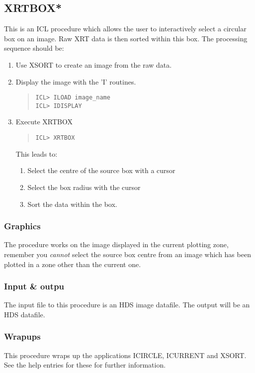 \documentclass{book}
\renewcommand{\_}{{\tt\char'137}}     %
\begin{document}
\subsection{XRTBOX*}
This is an ICL procedure which allows the user to interactively select
a circular box on an image. Raw XRT data is then sorted within this
box. The processing sequence should be:
 
\begin{enumerate}
\item Use XSORT to create an image from the raw data.
\item Display the image with the 'I' routines.
\begin{quote}\begin{verbatim}
ICL> ILOAD image_name
ICL> IDISPLAY
\end{verbatim}\end{quote}
\item Execute XRTBOX
\begin{quote}\begin{verbatim}
ICL> XRTBOX
\end{verbatim}\end{quote}
This leads to:
 
\begin{enumerate}
\item Select the centre of the source box with a cursor
\item Select the box radius with the cursor
\item Sort the data within the box.
\end{enumerate}
\end{enumerate}
\subsubsection{Graphics}
The procedure works on the image displayed in the current plotting zone,
remember you {\em cannot} select the source box centre from an image which
has been plotted in a zone other than the current one.
 
\subsubsection{Input \& outpu}
The input file to this procedure is an HDS image datafile. The output
will be an HDS datafile.
 
\subsubsection{Wrapups}
This procedure wraps up the applications ICIRCLE, ICURRENT and XSORT. See
the help entries for these for further information.
 
\end{document}
